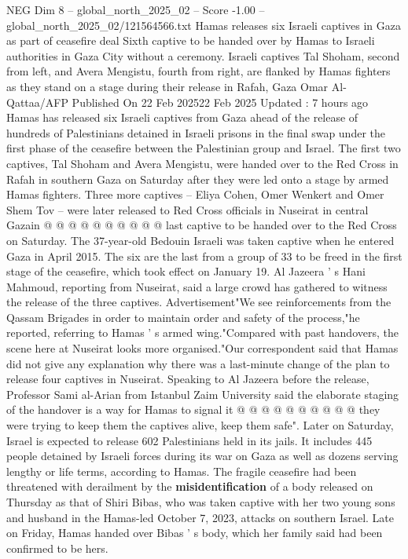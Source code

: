 \begin{textsample}{NEG Dim 8 – global\_north\_2025\_02 – Score -1.00 – global\_north\_2025\_02/121564566.txt}  \label{ex:f8_neg_432}
Hamas releases six Israeli captives in Gaza as part of ceasefire deal Sixth captive to be handed over by Hamas to Israeli authorities in Gaza City without a ceremony.
Israeli captives Tal Shoham, second from left, and Avera Mengistu, fourth from right, are flanked by Hamas fighters as they stand on a stage during their release in Rafah, Gaza Omar Al-Qattaa/AFP Published On 22 Feb 202522 Feb 2025 Updated : 7 hours ago Hamas has released six Israeli captives from Gaza ahead of the release of hundreds of Palestinians detained in Israeli prisons in the final swap under the first phase of the ceasefire between the Palestinian group and Israel.
The first two captives, Tal Shoham and Avera Mengistu, were handed over to the Red Cross in Rafah in southern Gaza on Saturday after they were led onto a stage by armed Hamas fighters.
Three more captives -- Eliya Cohen, Omer Wenkert and Omer Shem Tov -- were later released to Red Cross officials in Nuseirat in central Gazain @ @ @ @ @ @ @ @ @ @ last captive to be handed over to the Red Cross on Saturday.
The 37-year-old Bedouin Israeli was taken captive when he entered Gaza in April 2015.
The six are the last from a group of 33 to be freed in the first stage of the ceasefire, which took effect on January 19.
Al Jazeera ' s Hani Mahmoud, reporting from Nuseirat, said a large crowd has gathered to witness the release of the three captives.
Advertisement"We see reinforcements from the Qassam Brigades in order to maintain order and safety of the process,"he reported, referring to Hamas ' s armed wing."Compared with past handovers, the scene here at Nuseirat looks more organised."Our correspondent said that Hamas did not give any explanation why there was a last-minute change of the plan to release four captives in Nuseirat.
Speaking to Al Jazeera before the release, Professor Sami al-Arian from Istanbul Zaim University said the elaborate staging of the handover is a way for Hamas to signal it @ @ @ @ @ @ @ @ @ @ they were trying to keep them the captives alive, keep them safe".
Later on Saturday, Israel is expected to release 602 Palestinians held in its jails.
It includes 445 people detained by Israeli forces during its war on Gaza as well as dozens serving lengthy or life terms, according to Hamas.
The fragile ceasefire had been threatened with derailment by the \textbf{misidentification} of a body released on Thursday as that of Shiri Bibas, who was taken captive with her two young sons and husband in the Hamas-led October 7, 2023, attacks on southern Israel.
Late on Friday, Hamas handed over Bibas ' s body, which her family said had been confirmed to be hers.

\end{textsample}
